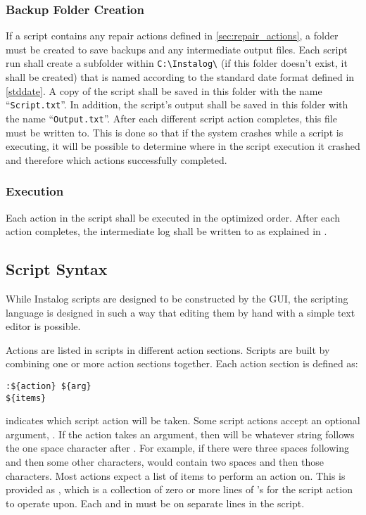 \subsubsection{Backup Folder Creation} \label{sec:backup_folder}
If a script contains any repair actions defined in \ref{sec:repair_actions}, a
folder must be created to save backups and any intermediate output files.  Each
script run shall create a subfolder within \verb|C:\Instalog\| (if this folder
doesn't exist, it shall be created) that is named according to the standard date
format defined in \ref{stddate}.  A copy of the script shall be saved in this
folder with the name ``\verb|Script.txt|''.  In addition, the script's output
shall be saved in this folder with the name ``\verb|Output.txt|''.  After each
different script action completes, this file must be written to.  This is done
so that if the system crashes while a script is executing, it will be possible
to determine where in the script execution it crashed and therefore which
actions successfully completed.
\subsubsection{Execution}
Each action in the script shall be executed in the optimized order.  After each
action completes, the intermediate log shall be written to as explained in
\label{sec:backup_folder}.

\subsection{Script Syntax} \label{sec:script_syntax}
While Instalog scripts are designed to be constructed by the GUI, the scripting
language is designed in such a way that editing them by hand with a simple text
editor is possible.  

Actions are listed in scripts in different action sections.  Scripts are built
by combining one or more action sections together.  Each action section is
defined as:
\begin{verbatim}
:${action} ${arg}
${items}
\end{verbatim}
 indicates which script action will be taken.  Some script actions
accept an optional argument, .  If the action takes an argument,
then  will be whatever string follows the one space character after
.  For example, if there were three spaces following 
and then some other characters,  would contain two spaces and then
those characters.  Most actions expect a list of items to perform an action on. 
This is provided as , which is a collection of zero or more lines of
's for the script action to operate upon.  Each  and
 in  must be on separate lines in the script.

